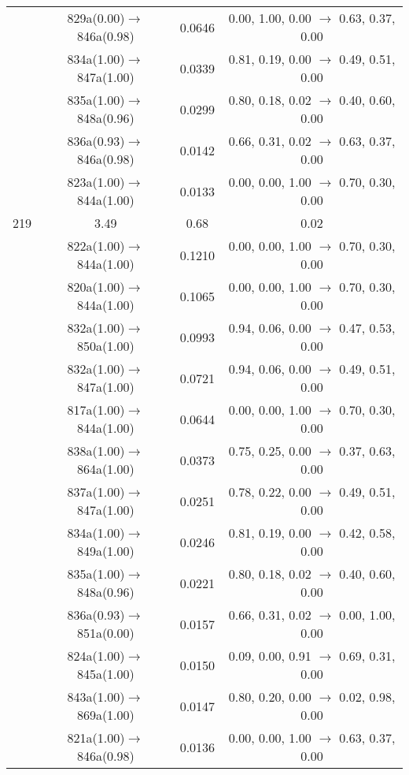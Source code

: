 \documentclass[10pt,a4paper]{article}
\begin{document}
\begin{longtable}{c|c|c|c}
 	& 829a(0.00)$\rightarrow$846a(0.98) &	 0.0646 &	 0.00, 1.00, 0.00 $\rightarrow$ 0.63, 0.37, 0.00 \\ 
 	& 834a(1.00)$\rightarrow$847a(1.00) &	 0.0339 &	 0.81, 0.19, 0.00 $\rightarrow$ 0.49, 0.51, 0.00 \\ 
 	& 835a(1.00)$\rightarrow$848a(0.96) &	 0.0299 &	 0.80, 0.18, 0.02 $\rightarrow$ 0.40, 0.60, 0.00 \\ 
 	& 836a(0.93)$\rightarrow$846a(0.98) &	 0.0142 &	 0.66, 0.31, 0.02 $\rightarrow$ 0.63, 0.37, 0.00 \\ 
 	& 823a(1.00)$\rightarrow$844a(1.00) &	 0.0133 &	 0.00, 0.00, 1.00 $\rightarrow$ 0.70, 0.30, 0.00 \\ 
 \hline219 &	 3.49 &	 0.68 &	 0.02 \\ 
  	& 822a(1.00)$\rightarrow$844a(1.00) &	 0.1210 &	 0.00, 0.00, 1.00 $\rightarrow$ 0.70, 0.30, 0.00 \\ 
 	& 820a(1.00)$\rightarrow$844a(1.00) &	 0.1065 &	 0.00, 0.00, 1.00 $\rightarrow$ 0.70, 0.30, 0.00 \\ 
 	& 832a(1.00)$\rightarrow$850a(1.00) &	 0.0993 &	 0.94, 0.06, 0.00 $\rightarrow$ 0.47, 0.53, 0.00 \\ 
 	& 832a(1.00)$\rightarrow$847a(1.00) &	 0.0721 &	 0.94, 0.06, 0.00 $\rightarrow$ 0.49, 0.51, 0.00 \\ 
 	& 817a(1.00)$\rightarrow$844a(1.00) &	 0.0644 &	 0.00, 0.00, 1.00 $\rightarrow$ 0.70, 0.30, 0.00 \\ 
 	& 838a(1.00)$\rightarrow$864a(1.00) &	 0.0373 &	 0.75, 0.25, 0.00 $\rightarrow$ 0.37, 0.63, 0.00 \\ 
 	& 837a(1.00)$\rightarrow$847a(1.00) &	 0.0251 &	 0.78, 0.22, 0.00 $\rightarrow$ 0.49, 0.51, 0.00 \\ 
 	& 834a(1.00)$\rightarrow$849a(1.00) &	 0.0246 &	 0.81, 0.19, 0.00 $\rightarrow$ 0.42, 0.58, 0.00 \\ 
 	& 835a(1.00)$\rightarrow$848a(0.96) &	 0.0221 &	 0.80, 0.18, 0.02 $\rightarrow$ 0.40, 0.60, 0.00 \\ 
 	& 836a(0.93)$\rightarrow$851a(0.00) &	 0.0157 &	 0.66, 0.31, 0.02 $\rightarrow$ 0.00, 1.00, 0.00 \\ 
 	& 824a(1.00)$\rightarrow$845a(1.00) &	 0.0150 &	 0.09, 0.00, 0.91 $\rightarrow$ 0.69, 0.31, 0.00 \\ 
 	& 843a(1.00)$\rightarrow$869a(1.00) &	 0.0147 &	 0.80, 0.20, 0.00 $\rightarrow$ 0.02, 0.98, 0.00 \\ 
 	& 821a(1.00)$\rightarrow$846a(0.98) &	 0.0136 &	 0.00, 0.00, 1.00 $\rightarrow$ 0.63, 0.37, 0.00 \\ 

\end{longtable}
\end{document}

